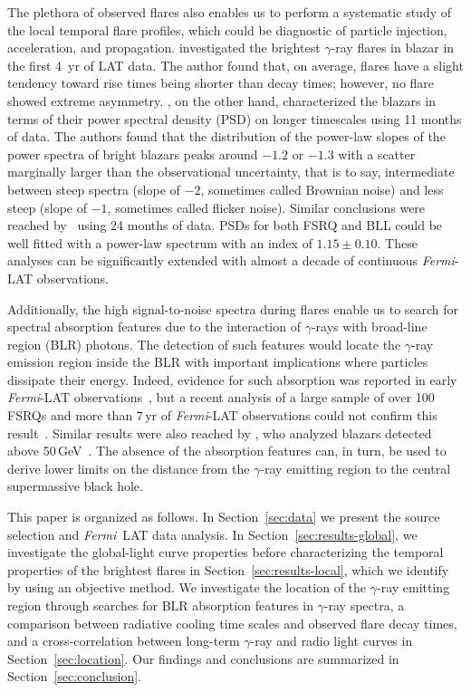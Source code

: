 \documentclass[twocolumn]{aastex62}
\newcommand{\Grays}{$\gamma$-rays\xspace}
\newcommand{\gray}{$\gamma$-ray\xspace}
\newcommand{\FermiLAT}{\emph{Fermi}~LAT\xspace}
\newcommand{\fermiLAT}{\emph{Fermi}-LAT\xspace}
\begin{document}
The plethora of observed flares also enables us to perform a systematic study of the local temporal flare profiles, which could be diagnostic of particle injection, acceleration, and propagation.
\citet{2013MNRAS.430.1324N} investigated the brightest \gray flares in blazar in the first 4~yr of LAT data.
The author found that, on average, flares have a slight tendency toward rise times being shorter than decay times; however, no flare showed extreme asymmetry. 
\citet{2010ApJ...722..520A}, on the other hand, characterized the blazars in terms of their power spectral density (PSD) on longer timescales using 11 months of data.
The authors found that the distribution of the power-law slopes of the power spectra of bright blazars peaks around $-1.2$ or $-1.3$ with a scatter marginally larger than the observational uncertainty,  that is to say, intermediate between steep spectra (slope of $-2$, sometimes called Brownian noise) and less steep (slope of $-1$, sometimes called flicker noise).
Similar conclusions were reached by~\citet{2LAC} using 24 months of data. PSDs for both FSRQ and BLL could be well fitted with a power-law spectrum with an index of $1.15\pm0.10$.
These analyses can be significantly extended with almost a decade of continuous \fermiLAT observations.

Additionally, the high signal-to-noise spectra during flares enable us to search for spectral absorption features due to the interaction of \Grays with broad-line region (BLR) photons.
The detection of such features would locate the \gray emission region inside the BLR with important implications where particles dissipate their energy. 
Indeed, evidence for such absorption was reported in early  \fermiLAT observations~\citep{2010ApJ...717L.118P,2014ApJ...794....8S}, but a recent analysis of a large sample of over 100 FSRQs and more than 7\,yr of \fermiLAT observations could not confirm this result~\citep{2018MNRAS.477.4749C}.
Similar results were also reached by \citet{2019arXiv190103494V}, who analyzed blazars detected above 50\,GeV~\citep{2016ApJS..222....5A}.
The absence of the absorption features can, in turn, be used to derive lower limits on the distance from the \gray emitting region to the central supermassive black hole. 

This paper is organized as follows. 
In Section~\ref{sec:data} we present the source selection and \FermiLAT data analysis.
In Section~\ref{sec:results-global}, we investigate the global-light curve properties before characterizing the temporal properties of the brightest flares in Section~\ref{sec:results-local}, which we identify by using an objective method.
We investigate the location of the \gray emitting region through searches for BLR absorption features in \gray spectra, a comparison between radiative cooling time scales and observed flare decay times, and a cross-correlation between long-term \gray and radio light curves in Section~\ref{sec:location}. 
Our findings and conclusions are summarized in Section~\ref{sec:conclusion}.
\end{document}
